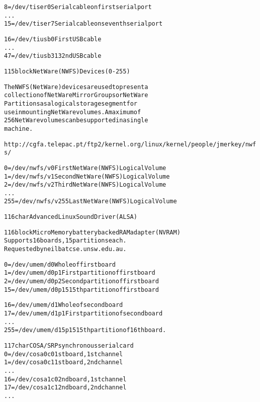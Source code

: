 \documentclass[a4paper,8pt,english]{sphinxmanual}
\begin{document}
\begin{alltt}
                  8 = /dev/tiser0    Serial cable on first serial port
                  ...
                 15 = /dev/tiser7    Serial cable on seventh serial port

                 16 = /dev/tiusb0    First USB cable
                  ...
                 47 = /dev/tiusb31   32nd USB cable

 115 block       NetWare (NWFS) Devices (0-255)

                The NWFS (NetWare) devices are used to present a
                collection of NetWare Mirror Groups or NetWare
                Partitions as a logical storage segment for
                use in mounting NetWare volumes.  A maximum of
                 256 NetWare volumes can be supported in a single
                machine.

                http://cgfa.telepac.pt/ftp2/kernel.org/linux/kernel/people/jmerkey/nwfs/

                 0 = /dev/nwfs/v0    First NetWare (NWFS) Logical Volume
                 1 = /dev/nwfs/v1    Second NetWare (NWFS) Logical Volume
                 2 = /dev/nwfs/v2    Third NetWare (NWFS) Logical Volume
                      ...
                 255 = /dev/nwfs/v255    Last NetWare (NWFS) Logical Volume

 116 char       Advanced Linux Sound Driver (ALSA)

 116 block       MicroMemory battery backed RAM adapter (NVRAM)
                Supports 16 boards, 15 partitions each.
                Requested by neilb at cse.unsw.edu.au.

                 0 = /dev/umem/d0      Whole of first board
                 1 = /dev/umem/d0p1    First partition of first board
                 2 = /dev/umem/d0p2    Second partition of first board
                15 = /dev/umem/d0p15   15th partition of first board

                16 = /dev/umem/d1      Whole of second board
                17 = /dev/umem/d1p1    First partition of second board
                    ...
                255= /dev/umem/d15p15  15th partition of 16th board.

 117 char       COSA/SRP synchronous serial card
                  0 = /dev/cosa0c0      1st board, 1st channel
                  1 = /dev/cosa0c1      1st board, 2nd channel
                    ...
                 16 = /dev/cosa1c0      2nd board, 1st channel
                 17 = /dev/cosa1c1      2nd board, 2nd channel
                    ...


\end{alltt}
\end{document}
